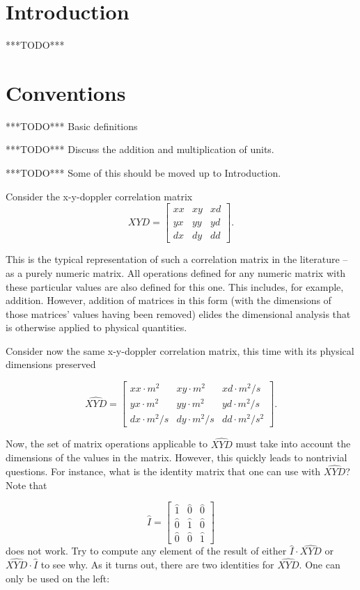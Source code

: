 \documentclass[10pt,letterpaper]{article}
\author{T. Zachary Laine}
\numberwithin{equation}{section}
\begin{document}
\section{Introduction}

***TODO***

\section{Conventions}

***TODO*** Basic definitions

***TODO*** Discuss the addition and multiplication of units.

***TODO*** Some of this should be moved up to Introduction.

Consider the x-y-doppler correlation matrix
\[XYD = \left[ \begin{matrix}
xx & xy & xd \\ yx & yy & yd \\ dx & dy & dd
\end{matrix} \right]. \]

This is the typical representation of such a correlation matrix in the
literature – as a purely numeric matrix.  All operations defined for
any numeric matrix with these particular values are also defined for
this one.  This includes, for example, addition.  However, addition of
matrices in this form (with the dimensions of those matrices' values
having been removed) elides the dimensional analysis that is otherwise
applied to physical quantities.

Consider now the same x-y-doppler correlation matrix, this time with
its physical dimensions preserved

\[ \widehat{XYD}= \left[ \begin{matrix}
  xx \cdot m^2 & xy \cdot m^2 & xd \cdot m^2/s \\
  yx \cdot m^2 & yy \cdot m^2 & yd \cdot m^2/s \\
  dx \cdot m^2/s & dy \cdot m^2/s & dd \cdot m^2/s^2
\end{matrix} \right]. \]

Now, the set of matrix operations applicable to $\widehat{XYD}$ must take into
account the dimensions of the values in the matrix.  However, this quickly
leads to nontrivial questions.  For instance, what is the identity matrix that
one can use with $\widehat{XYD}$?  Note that

\[ \hat I = \left[ \begin{matrix} 
  \hat 1 & \hat 0 & \hat 0 \\
  \hat 0 & \hat 1 & \hat 0 \\
  \hat 0 & \hat 0 & \hat 1
 \end{matrix} \right] \] does not work.  Try to compute any element of
the result of either $\hat I \cdot \widehat{XYD}$ or $\widehat{XYD}
\cdot \hat I$ to see why.  As it turns out, there are two identities
for $\widehat{XYD}$.  One can only be used on the left:
 
\end{document}

